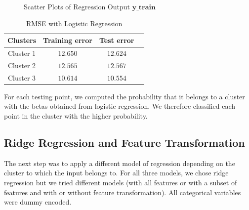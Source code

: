 \documentclass{article} %
\begin{document}
\begin{figure}[!h]
\center
{}
\caption{Scatter Plots of Regression Output $\mathbf{y\_train}$}
\label{fig:rlvtft}
\end{figure}

\begin{table}[!h]
\begin{center}
\begin{tabular}{|c||c|c|c|}
    \hline
    Clusters & Training error & Test error  \\
    \hline\hline
    Cluster 1 &$12.650$ & $12.624$ \\
    \hline
    Cluster 2 &$12.565$&$12.567$ \\
    \hline
    Cluster 3 &$10.614$&$10.554$ \\
    \hline
\end{tabular}
\caption{RMSE with Logistic Regression}
\label{table:errTable}
\end{center}
\end{table}


For each testing point, we computed the probability that it belongs to a cluster with the betas obtained from logistic regression. We therefore classified each point in the cluster with the higher probability.

\subsection{Ridge Regression and Feature Transformation}
The next step was to apply a different model of regression depending on the cluster to which the input belongs to. For all three models, we chose ridge regression but we tried different models (with all features or with a subset of features and with or without feature transformation). All categorical variables were dummy encoded.
\end{document}
